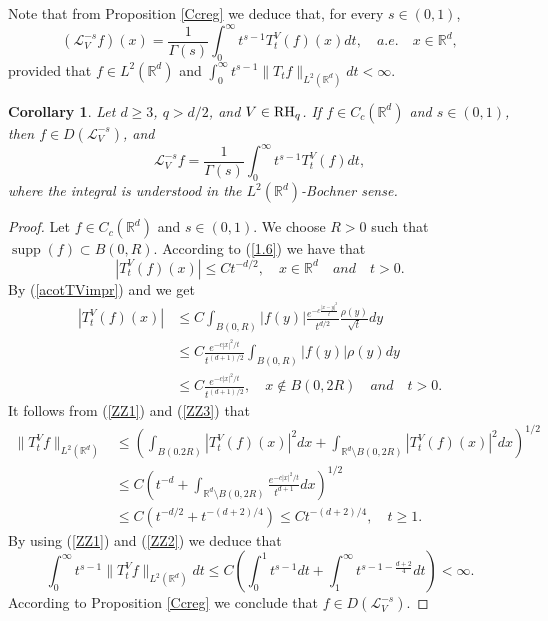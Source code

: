 \documentclass[10pt, a4paper, reqno]{amsart}
\newtheorem{cor}[thm]{Corollary}
\theoremstyle{definition}
\theoremstyle{remark}
\DeclareMathOperator{\supp}{supp}
\numberwithin{equation}{section}
\begin{document}
Note that from Proposition \ref{Ccreg} we deduce that, for every $s\in (0,1)$,
\[
(\mathcal{L}_V^{-s}f)(x)=\frac{1}{\Gamma(s)}\int_0^\infty t^{s-1}T_t^V(f)(x)dt, \quad a.e.\quad x\in \mathbb{R}^d,
\]
provided that $f\in L^2(\mathbb{R}^d)$ and $\int_0^\infty t^{s-1}\|T_tf\|_{L^2(\mathbb{R}^d)}dt<\infty$.

\begin{cor}\label{cor1} Let $d\geq 3$, $q>d/2$, and $V\in {\rm RH}_q$. If $f\in C_c(\mathbb{R}^d)$ and $s\in (0,1)$, then $f\in D(\mathcal{L}_V^{-s})$, and
\[
\mathcal L_V^{-s}f=\frac{1}{\Gamma(s)}\int_0^\infty t^{s-1}T_t^V(f)dt,
\]
where the integral is understood in the $L^2(\mathbb R^d)$-Bochner sense.
\end{cor}

\begin{proof}
 Let $f\in C_c(\mathbb{R}^d)$  and $s\in (0,1)$. We choose $R>0$ such that $\supp(f)\subset B(0,R)$. According to (\ref{1.6}) we have that
 \begin{equation}\label{ZZ1}
|T_t^V(f)(x)|\le Ct^{-d/2}, \quad x\in \mathbb{R}^d\quad and \quad t>0.
 \end{equation}
 By (\ref{acotTVimpr}) and \cite[Lemma 1.4(b)]{Sh1} we get
 \begin{align}\label{ZZ3}
 |T_t^V(f)(x)|&\le C\int_{B(0,R)}|f(y)|\frac{e^{-c\frac{|x-y|^2}{t}}}{t^{d/2}}\frac{\rho(y)}{\sqrt{t}}dy\nonumber\\
 &\le C \frac{e^{-c|x|^2/t}}{t^{(d+1)/2}}\int_{B(0,R)}|f(y)|\rho(y)dy\nonumber\\
 &\le C \frac{e^{-c|x|^2/t}}{t^{(d+1)/2}},\quad x\notin B(0,2R)\quad and\quad t>0.
 \end{align}
 It follows from (\ref{ZZ1}) and (\ref{ZZ3}) that
\begin{align}\label{ZZ2} 
\|T_t^Vf\|_{L^2(\mathbb{R}^d)}&\le \left(\int_{B(0.2R)}|T_t^V(f)(x)|^2dx+\int_{\mathbb{R}^d\setminus B(0,2R)}|T_t^V(f)(x)|^2dx\right)^{1/2}\nonumber\\
&\le C\left(t^{-d}+ \int_{\mathbb{R}^d\setminus B(0,2R)}\frac{e^{-c|x|^2/t}}{t^{d+1}}dx\right)^{1/2}\nonumber\\
&\le C\left(t^{-d/2}+t^{-(d+2)/4}\right)\le Ct^{-(d+2)/4},\quad t\ge 1.
\end{align}
By using (\ref{ZZ1}) and (\ref{ZZ2}) we deduce that
\[
\int_0^\infty t^{s-1}\|T_t^Vf\|_{L^2(\mathbb{R}^d)}dt\le C\left(\int_0^1 t^{s-1}dt+\int_1^\infty t^{s-1-\frac{d+2}{4}}dt\right)<\infty.
\]
According to Proposition \ref{Ccreg} we conclude that $f\in D(\mathcal{L}_V^{-s})$.
\end{proof}
\end{document}
